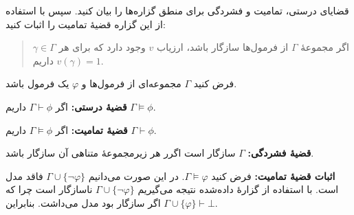قضایای درستی، تمامیت و فشردگی برای منطق گزاره‌ها را بیان کنید. سپس با استفاده از این گزاره قضیهٔ تمامیت را اثبات کنید:
\begin{quote}
    اگر مجموعهٔ
    $\Gamma$
    از فرمول‌ها سازگار باشد، ارزیاب
    $v$
    وجود دارد که برای هر
    $\gamma\in\Gamma$
    داریم
    $v(\gamma)=1$.
\end{quote}\quad\vspace{-0.5cm}
\begin{ans}
    فرض کنید
    $\Gamma$
    مجموعه‌ای از فرمول‌ها
    و
    $\varphi$
    یک فرمول باشد.

    \textbf{قضیهٔ درستی:}
    اگر
    $\Gamma\vdash\phi$
    داریم
    $\Gamma\models\phi$.

    \textbf{قضیهٔ تمامیت:}
    اگر
    $\Gamma\models\phi$
    داریم
    $\Gamma\vdash\phi$.

    \textbf{قضیهٔ فشردگی:}
    $\Gamma$
    سازگار است اگرر هر زیرمجموعهٔ متناهی آن سازگار باشد.

    \textbf{اثبات قضیهٔ تمامیت:}
    فرض کنید
    $\Gamma\models\varphi$.
    در این صورت می‌دانیم
    $\Gamma\cup\{\neg\varphi\}$
    فاقد مدل است. با استفاده از گزارهٔ داده‌شده نتیجه می‌گیریم
    $\Gamma\cup\{\neg\varphi\}$
    ناسازگار است چرا که اگر سازگار بود مدل می‌داشت. بنابراین
    $\Gamma\cup\{\varphi\}\vdash\bot$.

\end{ans}

